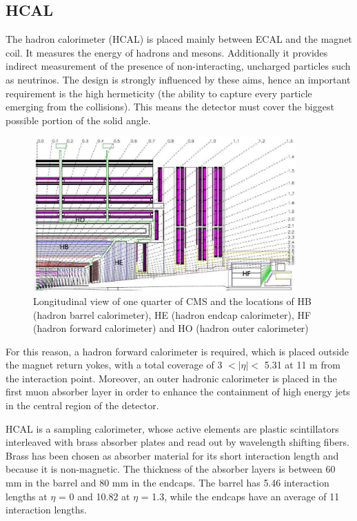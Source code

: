 \subsection{HCAL}

The hadron calorimeter (HCAL) is placed mainly between ECAL and the magnet coil. It measures the energy of hadrons and mesons. Additionally it provides indirect measurement of the presence of non-interacting, uncharged particles such as neutrinos. The design is strongly influenced by these aims, hence an important requirement is the high hermeticity (the ability to capture every particle emerging from the collisions). This means the detector must cover the biggest possible portion of the solid angle.

\begin{figure}[hbtp]
  \begin{center}
    \includegraphics[width=0.9\textwidth]{figure/CH2/HCAL.png}
  \end{center}
  \caption{\label{fig:HCAL}Longitudinal view of one quarter of CMS and the locations of HB (hadron barrel calorimeter), HE (hadron endcap calorimeter), HF (hadron forward calorimeter) and HO (hadron outer calorimeter)}
\end{figure}

For this reason, a hadron forward calorimeter is required, which is placed outside the magnet return yokes, with a total coverage of 3 $< |\eta| <$ 5.31 at 11 m from the interaction point. Moreover, an outer hadronic calorimeter is placed in the first muon absorber layer in order to enhance the containment of high energy jets in the central region of the detector.

HCAL is a sampling calorimeter, whose active elements are plastic scintillators interleaved with brass absorber plates and read out by wavelength shifting fibers. Brass has been chosen as absorber material for its short interaction length and because it is non-magnetic. The thickness of the absorber layers is between 60 mm in the barrel and 80 mm in the endcaps. The barrel has 5.46 interaction lengths at $\eta$ = 0 and 10.82 at $\eta$ = 1.3, while the endcaps have an average of 11 interaction lengths\cite{CMS_AN_2006-138}.

